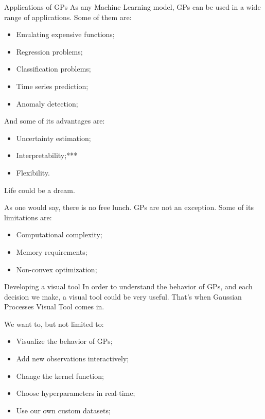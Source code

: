 \documentclass[xcolor=dvipsnames,t,aspectratio=169]{beamer} %
\newcommand{\highlight}[1]{{\color{fgv_light_blue} #1}}
\begin{document}
\begin{frame}[c]{Applications of \highlight{GPs}}
    As any Machine Learning model, GPs can be used in a wide range of applications. Some of them are:

    \begin{itemize}
        \item Emulating \highlight{expensive} functions;
        \item \highlight{Regression} problems;
        \item \highlight{Classification} problems;
        \item \highlight{Time series} prediction;
        \item Anomaly \highlight{detection};
    \end{itemize}

    And some of its \highlight{advantages} are:
    \begin{itemize}
        \item \highlight{Uncertainty} estimation;
        \item \highlight{Interpretability};***
        \item \highlight{Flexibility}.
    \end{itemize}
\end{frame}

\begin{frame}[c]{Life \highlight{could} be a dream.}

    As one would say, \highlight{there is no free lunch}. GPs are not an exception. Some of its \highlight{limitations} are:

    \begin{itemize}
        \item \highlight{Computational} complexity;
        \item \highlight{Memory} requirements;
        \item \highlight{Non-convex} optimization;
    \end{itemize}
\end{frame}

\begin{frame}[c]{Developing a \highlight{visual} tool}
    In order to understand the behavior of GPs, and each decision we make, a \highlight{visual} tool could be very useful. That's when Gaussian Processes Visual Tool comes in.

    We want to, but not limited to:

    \begin{itemize}
        \item \highlight{Visualize} the behavior of GPs;
        \item Add new observations \highlight{interactively};
        \item Change the \highlight{kernel} function;
        \item \highlight{Choose} hyperparameters in real-time;
        \item Use our own custom \highlight{datasets};
    \end{itemize}
\end{frame}
\end{document}
